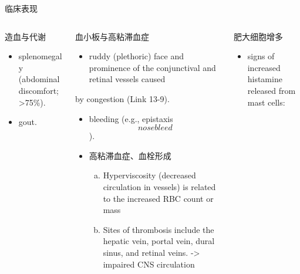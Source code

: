 \documentclass[
  ignorenonframetext,
]{beamer}
\providecommand{\tightlist}{%
  \setlength{\itemsep}{0pt}\setlength{\parskip}{0pt}}
\begin{document}
\begin{frame}
\begin{block}{临床表现}
\protect\hypertarget{ux4e34ux5e8aux8868ux73b0}{}
\end{block}

\begin{columns}[T]
\begin{column}{0.3\textwidth}
\begin{block}{造血与代谢}
\protect\hypertarget{ux9020ux8840ux4e0eux4ee3ux8c22}{}
\begin{itemize}
\item
  splenomegaly (abdominal discomfort; \textgreater75\%).
\item
  gout.
\end{itemize}
\end{block}
\end{column}

\begin{column}{0.3\textwidth}
\begin{block}{血小板与高粘滞血症}
\protect\hypertarget{ux8840ux5c0fux677fux4e0eux9ad8ux7c98ux6edeux8840ux75c7}{}
\begin{itemize}
\tightlist
\item
  ruddy (plethoric) face and prominence of the conjunctival and retinal
  vessels caused
\end{itemize}

by congestion (Link 13-9).

\begin{itemize}
\item
  bleeding (e.g., epistaxis \[nose bleed\]).
\item
  高粘滞血症、血栓形成

  \begin{enumerate}
  [(a)]
  \item
    Hyperviscosity (decreased circulation in vessels) is related to the
    increased RBC count or mass
  \item
    Sites of thrombosis include the hepatic vein, portal vein, dural
    sinus, and retinal veins. -\textgreater{} impaired CNS circulation
  \end{enumerate}
\end{itemize}
\end{block}
\end{column}

\begin{column}{0.3\textwidth}
\begin{block}{肥大细胞增多}
\protect\hypertarget{ux80a5ux5927ux7ec6ux80deux589eux591a}{}
\begin{itemize}
\item
  signs of increased histamine released from mast cells:


\end{itemize}
\end{block}
\end{column}
\end{columns}
\end{frame}
\end{document}
